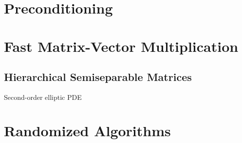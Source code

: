 \section{Preconditioning}

\section{Fast Matrix-Vector Multiplication}
\subsection{Hierarchical Semiseparable Matrices}
\begin{example}
    Second-order elliptic PDE
\end{example}
\section{Randomized Algorithms}


% 
\nocite{}


